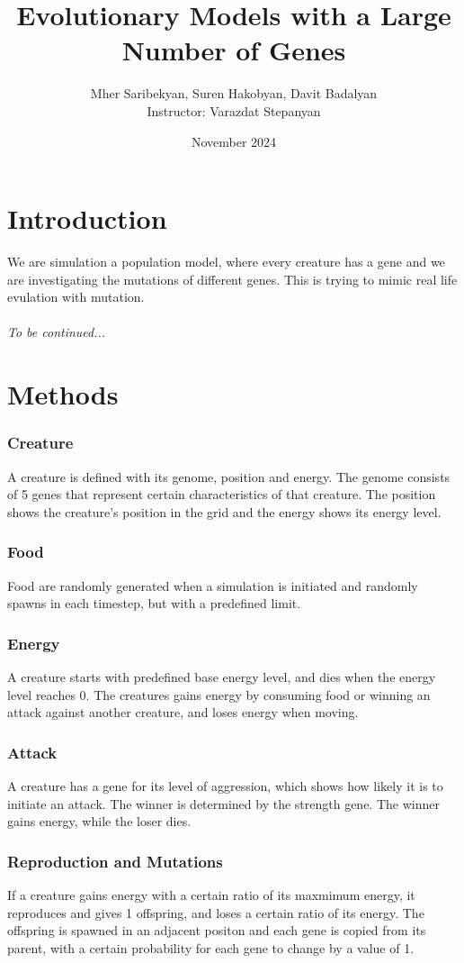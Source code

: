 \documentclass{report}
\title{Evolutionary Models with a Large Number of Genes}
\author{
    Mher Saribekyan, Suren Hakobyan, Davit Badalyan\\
    Instructor: Varazdat Stepanyan 
}
\affil{American University of Armenia}
\date{November 2024}
\begin{document}
\maketitle
\tableofcontents
\section{Introduction}
We are simulation a population model, where every creature has a gene and we are investigating the mutations of different genes.
This is trying to mimic real life evulation with mutation.\\\\
\textit{To be continued...}
\section{Methods}
\subsubsection{Creature}
A creature is defined with its genome, position and energy.
The genome consists of 5 genes that represent certain characteristics of that creature.
The position shows the creature's position in the grid and the energy shows its energy level.
\subsubsection{Food}
Food are randomly generated when a simulation is initiated and randomly spawns in each timestep, but with a predefined limit.
\subsubsection{Energy}
A creature starts with predefined base energy level, and dies when the energy level reaches 0.
The creatures gains energy by consuming food or winning an attack against another creature, and loses energy when moving.
\subsubsection{Attack}
A creature has a gene for its level of aggression, which shows how likely it is to initiate an attack.
The winner is determined by the strength gene. The winner gains energy, while the loser dies.
\subsubsection{Reproduction and Mutations}
If a creature gains energy with a certain ratio of its maxmimum energy, it reproduces and gives 1 offspring, and loses a certain ratio of its energy.
The offspring is spawned in an adjacent positon and each gene is copied from its parent, with a certain probability for each gene to change by a value of 1.
\end{document}

